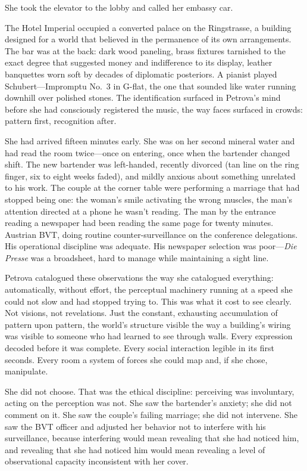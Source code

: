 She took the elevator to the lobby and called her embassy car.

\scenebreak

The Hotel Imperial occupied a converted palace on the Ringstrasse, a building designed for a world that believed in the permanence of its own arrangements. The bar was at the back: dark wood paneling, brass fixtures tarnished to the exact degree that suggested money and indifference to its display, leather banquettes worn soft by decades of diplomatic posteriors. A pianist played Schubert---Impromptu No.\ 3 in G-flat, the one that sounded like water running downhill over polished stones. The identification surfaced in Petrova's mind before she had consciously registered the music, the way faces surfaced in crowds: pattern first, recognition after.

She had arrived fifteen minutes early. She was on her second mineral water and had read the room twice---once on entering, once when the bartender changed shift. The new bartender was left-handed, recently divorced (tan line on the ring finger, six to eight weeks faded), and mildly anxious about something unrelated to his work. The couple at the corner table were performing a marriage that had stopped being one: the woman's smile activating the wrong muscles, the man's attention directed at a phone he wasn't reading. The man by the entrance reading a newspaper had been reading the same page for twenty minutes. Austrian BVT, doing routine counter-surveillance on the conference delegations. His operational discipline was adequate. His newspaper selection was poor---\textit{Die Presse} was a broadsheet, hard to manage while maintaining a sight line.

Petrova catalogued these observations the way she catalogued everything: automatically, without effort, the perceptual machinery running at a speed she could not slow and had stopped trying to. This was what it cost to see clearly. Not visions, not revelations. Just the constant, exhausting accumulation of pattern upon pattern, the world's structure visible the way a building's wiring was visible to someone who had learned to see through walls. Every expression decoded before it was complete. Every social interaction legible in its first seconds. Every room a system of forces she could map and, if she chose, manipulate.

She did not choose. That was the ethical discipline: perceiving was involuntary, acting on the perception was not. She saw the bartender's anxiety; she did not comment on it. She saw the couple's failing marriage; she did not intervene. She saw the BVT officer and adjusted her behavior not to interfere with his surveillance, because interfering would mean revealing that she had noticed him, and revealing that she had noticed him would mean revealing a level of observational capacity inconsistent with her cover.

